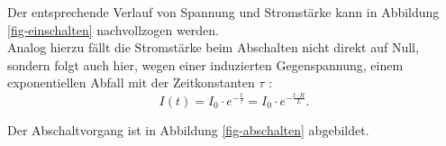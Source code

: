 \documentclass[page,pdftex,12pt,a4paper,twoside,openright]{scrbook}
\begin{document}
Der entsprechende Verlauf von Spannung und Stromstärke kann in Abbildung \ref{fig-einschalten} nachvollzogen werden.\\

Analog hierzu fällt die Stromstärke beim Abschalten nicht direkt auf Null, sondern folgt auch hier, wegen einer induzierten Gegenspannung, einem exponentiellen Abfall mit der Zeitkonstanten \(\tau\) \cite{raith_elektromagnetismus_2006}:\\

\begin{equation}
\label{eq-auschalten}
I(t) = I_{\mathrm{0}} \cdot e^{ -\frac{t}{\tau}}= I_{\mathrm{0}} \cdot e^{ -\frac{t \cdot R}{L}}.
\end{equation}

Der Abschaltvorgang ist in Abbildung \ref{fig-abschalten} abgebildet.\\
\end{document}
